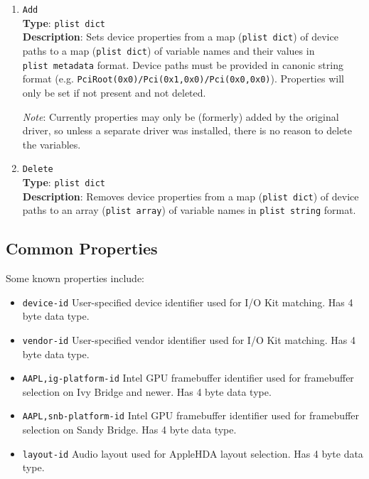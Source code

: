\documentclass[]{article}
\providecommand{\tightlist}{%
  \setlength{\itemsep}{0pt}\setlength{\parskip}{0pt}}
\begin{document}
\begin{enumerate}
\item
  \texttt{Add}\\
  \textbf{Type}: \texttt{plist\ dict}\\
  \textbf{Description}: Sets device properties from a map (\texttt{plist\ dict})
  of device paths to a map (\texttt{plist\ dict}) of variable names and their values
  in \texttt{plist\ metadata} format. Device paths must be provided in canonic string
  format (e.g. \texttt{PciRoot(0x0)/Pci(0x1,0x0)/Pci(0x0,0x0)}). Properties will only
  be set if not present and not deleted.

  \emph{Note}: Currently properties may only be (formerly) added by the original driver,
  so unless a separate driver was installed, there is no reason to delete the variables.

\item
  \texttt{Delete}\\
  \textbf{Type}: \texttt{plist\ dict}\\
  \textbf{Description}: Removes device properties from a map (\texttt{plist\ dict})
  of device paths to an array (\texttt{plist\ array}) of variable names in
  \texttt{plist\ string} format.

\end{enumerate}

\subsection{Common Properties}\label{devpropscommon}

Some known properties include:

\begin{itemize}
\tightlist
\item
  \texttt{device-id}
  \break
  User-specified device identifier used for I/O Kit matching. Has 4 byte data type.
\item
  \texttt{vendor-id}
  \break
  User-specified vendor identifier used for I/O Kit matching. Has 4 byte data type.
\item
  \texttt{AAPL,ig-platform-id}
  \break
  Intel GPU framebuffer identifier used for framebuffer selection on Ivy Bridge and newer.
  Has 4 byte data type.
\item
  \texttt{AAPL,snb-platform-id}
  \break
  Intel GPU framebuffer identifier used for framebuffer selection on Sandy Bridge.
  Has 4 byte data type.
\item
  \texttt{layout-id}
  \break
  Audio layout used for AppleHDA layout selection. Has 4 byte data type.
\end{itemize}
\end{document}
